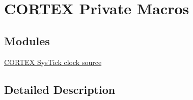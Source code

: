 \hypertarget{group___c_o_r_t_e_x___private___macros}{\section{C\-O\-R\-T\-E\-X Private Macros}
\label{group___c_o_r_t_e_x___private___macros}
}
\subsection*{Modules}
\begin{DoxyCompactItemize}
\item 
\hyperlink{group___c_o_r_t_e_x___sys_tick__clock__source___macro___private}{C\-O\-R\-T\-E\-X Sys\-Tick clock source}
\end{DoxyCompactItemize}


\subsection{Detailed Description}
